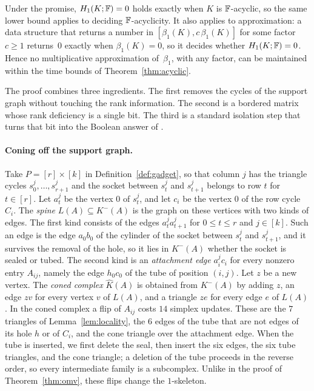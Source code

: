 Under the promise, $H_1(K;\mathbb{F})=0$ holds exactly when $K$ is $\mathbb{F}$-acyclic, so the same lower bound applies to deciding $\mathbb{F}$-acyclicity.
It also applies to approximation: a data structure that returns a number in $[\beta_1(K),c\,\beta_1(K)]$ for some factor $c\ge1$ returns~$0$ exactly when $\beta_1(K)=0$, so it decides whether $H_1(K;\mathbb{F})=0$.
Hence no multiplicative approximation of~$\beta_1$, with any factor, can be maintained within the time bounds of Theorem~\ref{thm:acyclic}.

The proof combines three ingredients.
The first removes the cycles of the support graph without touching the rank information.
The second is a bordered matrix whose rank deficiency is a single bit.
The third is a standard isolation step that turns that bit into the Boolean answer of \OuMv.

\paragraph{Coning off the support graph.}
Take $P=[r]\times[k]$ in Definition~\ref{def:gadget}, so that column $j$ has the triangle cycles $s^j_0,\dots,s^j_{r+1}$ and the socket between $s^j_t$ and $s^j_{t+1}$ belongs to row $t$ for $t\in[r]$.
Let $a^j_t$ be the vertex $0$ of $s^j_t$, and let $c_i$ be the vertex $0$ of the row cycle $C_i$.
The \emph{spine} $L(A)\subseteq K^-(A)$ is the graph on these vertices with two kinds of edges.
The first kind consists of the edges $a^j_ta^j_{t+1}$ for $0\le t\le r$ and $j\in[k]$.
Such an edge is the edge $a_0b_0$ of the cylinder of the socket between $s^j_t$ and $s^j_{t+1}$, and it survives the removal of the hole, so it lies in $K^-(A)$ whether the socket is sealed or tubed.
The second kind is an \emph{attachment edge} $a^j_ic_i$ for every nonzero entry $A_{ij}$, namely the edge $h_0c_0$ of the tube of position $(i,j)$.
Let $z$ be a new vertex.
The \emph{coned complex} $\widehat K(A)$ is obtained from $K^-(A)$ by adding $z$, an edge $zv$ for every vertex $v$ of $L(A)$, and a triangle $ze$ for every edge $e$ of $L(A)$.
In the coned complex a flip of $A_{ij}$ costs $14$ simplex updates.
These are the $7$ triangles of Lemma~\ref{lem:locality}, the $6$ edges of the tube that are not edges of its hole $h$ or of $C_i$, and the cone triangle over the attachment edge.
When the tube is inserted, we first delete the seal, then insert the six edges, the six tube triangles, and the cone triangle; a deletion of the tube proceeds in the reverse order, so every intermediate family is a subcomplex.
Unlike in the proof of Theorem~\ref{thm:omv}, these flips change the $1$-skeleton.

